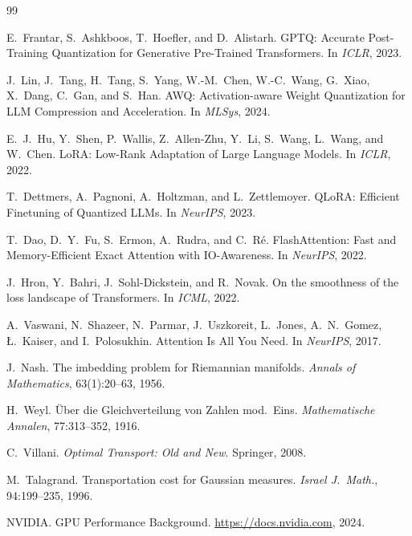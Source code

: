 \documentclass[11pt,a4paper]{article}
\begin{document}
\begin{thebibliography}{99}

E.~Frantar, S.~Ashkboos, T.~Hoefler, and D.~Alistarh.
\newblock GPTQ: Accurate Post-Training Quantization for Generative Pre-Trained Transformers.
\newblock In \emph{ICLR}, 2023.

J.~Lin, J.~Tang, H.~Tang, S.~Yang, W.-M.~Chen, W.-C.~Wang, G.~Xiao, X.~Dang, C.~Gan, and S.~Han.
\newblock AWQ: Activation-aware Weight Quantization for LLM Compression and Acceleration.
\newblock In \emph{MLSys}, 2024.

E.~J.~Hu, Y.~Shen, P.~Wallis, Z.~Allen-Zhu, Y.~Li, S.~Wang, L.~Wang, and W.~Chen.
\newblock LoRA: Low-Rank Adaptation of Large Language Models.
\newblock In \emph{ICLR}, 2022.

T.~Dettmers, A.~Pagnoni, A.~Holtzman, and L.~Zettlemoyer.
\newblock QLoRA: Efficient Finetuning of Quantized LLMs.
\newblock In \emph{NeurIPS}, 2023.

T.~Dao, D.~Y.~Fu, S.~Ermon, A.~Rudra, and C.~R\'{e}.
\newblock FlashAttention: Fast and Memory-Efficient Exact Attention with IO-Awareness.
\newblock In \emph{NeurIPS}, 2022.

J.~Hron, Y.~Bahri, J.~Sohl-Dickstein, and R.~Novak.
\newblock On the smoothness of the loss landscape of Transformers.
\newblock In \emph{ICML}, 2022.

A.~Vaswani, N.~Shazeer, N.~Parmar, J.~Uszkoreit, L.~Jones, A.~N.~Gomez, \L.~Kaiser, and I.~Polosukhin.
\newblock Attention Is All You Need.
\newblock In \emph{NeurIPS}, 2017.

J.~Nash.
\newblock The imbedding problem for Riemannian manifolds.
\newblock \emph{Annals of Mathematics}, 63(1):20--63, 1956.

H.~Weyl.
\newblock \"Uber die Gleichverteilung von Zahlen mod.\ Eins.
\newblock \emph{Mathematische Annalen}, 77:313--352, 1916.

C.~Villani.
\newblock \emph{Optimal Transport: Old and New}.
\newblock Springer, 2008.

M.~Talagrand.
\newblock Transportation cost for Gaussian measures.
\newblock \emph{Israel J.\ Math.}, 94:199--235, 1996.

NVIDIA.
\newblock GPU Performance Background.
\newblock \url{https://docs.nvidia.com}, 2024.

\end{thebibliography}
\end{document}
